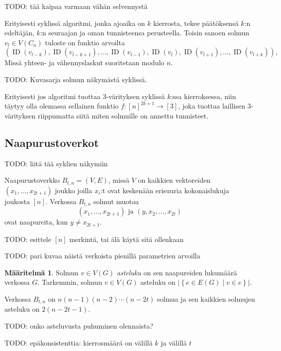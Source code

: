 \documentclass[finnish]{tktltiki2}
\theoremstyle{definition}
\newtheorem{maar}[lau]{Määritelmä}
\theoremstyle{remark}
\newcommand{\set}[1]{\left\{ #1 \right\}}
\DeclareMathOperator{\id}{ID}
\begin{document}
TODO: tää kaipaa varmaan vähän selvennystä

Erityisesti syklissä algoritmi, jonka ajoaika on $k$ kierrosta, tekee
päätöksensä $k$:n edeltäjän, $k$:n seuraajan ja oman tunnisteensa perusteella.
Toisin sanoen solmun $v_l \in V(C_n)$ tuloste on funktio arvoilta
%
\begin{equation*}
    \left(
        \id(v_{l-k}), \id(v_{l-k+1}), \dots,
        \id(v_{l-1}), \id(v_l), \id(v_{l+1}), \dots, \id(v_{l+k})
    \right),
\end{equation*}
%
Missä yhteen- ja vähennyslaskut suoritetaan modulo $n$.

TODO: Kuvasarja solmun näkymästä syklissä.

Erityisesti jos algoritmi tuottaa 3-värityksen syklissä $k$:ssa kierroksessa,
niin täytyy olla olemassa sellainen funktio $f: [n]^{2k+1} \to [3]$, joka
tuottaa laillisen 3-värityksen riippumatta siitä miten solmuille on annettu
tunnisteet.

\subsection{Naapurustoverkot}

TODO: liitä tää syklien näkymiin

Naapurustoverkko $B_{t,n} = (V,E)$, missä $V$ on kaikkien vektoreiden
$(x_1,\dots,x_{2t+1})$ joukko joilla $x_i$:t ovat keskenään erisuuria
kokonaislukuja joukosta $[n]$. Verkossa $B_{t,n}$ solmut muotoa
%
\begin{equation*}
    (x_1, \dots, x_{2t+1}) \text{ ja } (y,x_2,\dots,x_{2t})
\end{equation*}
%
ovat naapureita, kun $y \neq x_{2t+1}$.

TODO: esittele $[n]$ merkintä, tai älä käytä sitä ollenkaan

TODO: pari kuvaa näistä verkoista pienillä parametrien arvoilla

\begin{maar}
    Solmun $v \in V(G)$ \emph{asteluku} on sen naapureiden lukumäärä verkossa
    $G$. Tarkemmin, solmun $v \in V(G)$ asteluku on $|\set{e \in E(G) \mid v
        \in e}|$.
\end{maar}

Verkossa $B_{t,n}$ on $n(n-1)(n-2) \cdots (n-2t)$ solmua ja sen kaikkien
solmujen asteluku on $2(n-2t-1)$.

TODO: onko asteluvusta puhuminen olennaista?

TODO: epäkonsistenttia: kierrosmäärä on välillä $k$ ja välillä $t$
\end{document}
